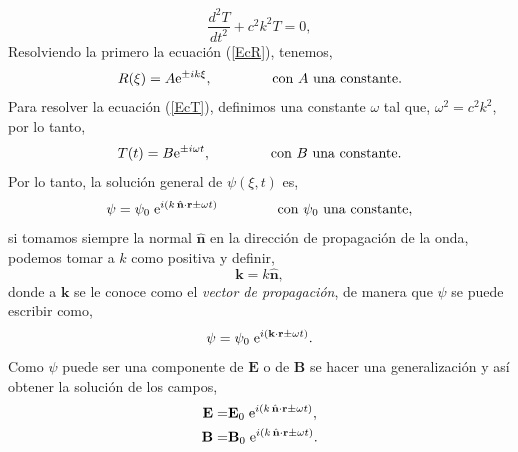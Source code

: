 \documentclass[11pt,fleqn]{book} %
\begin{document}
\begin{equation} \label{EcT}
\frac{d^2 T}{d t^2}+c^2k^2T=0,
\end{equation}
Resolviendo la primero la ecuaci\'on (\ref{EcR}), tenemos,
\begin{equation*}
R(\xi)=A \text{e}^{\pm ik\xi}, \hspace{1.5cm} \text{con $A$ una constante.}
\end{equation*}
Para resolver la ecuaci\'on (\ref{EcT}), definimos una constante $\omega$ tal que, $\omega^2=c^2k^2$, por lo tanto,
\begin{equation*}
T(t)=B \text{e}^{\pm i\omega t}, \hspace{1.5cm} \text{con $B$ una constante.}
\end{equation*}
Por lo tanto, la soluci\'on general de $\psi(\xi,t)$ es,
\begin{equation*}
\psi=\psi_0 \hspace{1mm}\text{e} ^{i(k\hspace{0.5mm}\hat{\textbf{n}}\cdot\textbf{r} \pm \omega t)} \hspace{1.5cm} \text{con $\psi_0$ una constante},
\end{equation*}
si tomamos siempre la normal $\hat{\textbf{n}}$ en la direcci\'on de propagaci\'on de la onda, podemos tomar a $k$ como positiva y definir,
\begin{equation} \label{Veck}
\textbf{k}=k\hat{\textbf{n}},
\end{equation}
donde a $\textbf{k}$ se le conoce como el \textit{vector de propagaci\'on}, de manera que $\psi$ se puede escribir como,
\begin{equation} \label{psi}
\psi=\psi_0 \hspace{1mm}\text{e} ^{i(\textbf{k}\cdot\textbf{r} \pm \omega t)}.
\end{equation}
Como $\psi$ puede ser una componente de $\textbf{E}$ o de $\textbf{B}$ se hacer una generalizaci\'on y as\'i obtener la soluci\'on de los campos,
\begin{equation}
\begin{split}
\textbf{E}=&\textbf{E}_0\hspace{1mm}\text{e} ^{i(k\hspace{0.5mm}\hat{\textbf{n}}\cdot\textbf{r} \pm \omega t)},\\
\textbf{B}=&\textbf{B}_0\hspace{1mm}\text{e} ^{i(k\hspace{0.5mm}\hat{\textbf{n}}\cdot\textbf{r} \pm \omega t)}.
\end{split}
\end{equation}
\end{document}
